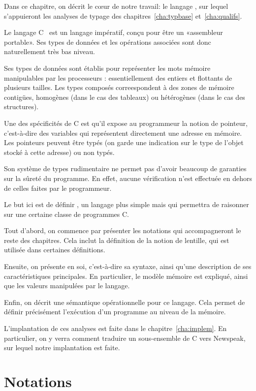 Dans ce chapitre, on décrit le cœur de notre travail: le langage \langname, sur
lequel s'appuieront les analyses de typage des chapitres~\ref{cha:typbase}
et~\ref{cha:qualifs}.

Le langage C~\cite{KandR} est un langage impératif, conçu pour être un
«assembleur portable». Ses types de données et les opérations associées sont
donc naturellement très bas niveau.

Ses types de données sont établis pour représenter les mots mémoire manipulables
par les processeurs : essentiellement des entiers et flottants de plusieurs
tailles. Les types composés correespondent à des zones de mémoire contigües,
homogènes (dans le cas des tableaux) ou hétérogènes (dans le cas des
structures).

Une des spécificités de C est qu'il expose au programmeur la notion de pointeur,
c'est-à-dire des variables qui représentent directement une adresse en mémoire.
Les pointeurs peuvent être typés (on garde une indication sur le type de l'objet
stocké à cette adresse) ou non typés.

Son système de types rudimentaire ne permet pas d'avoir beaucoup de garanties
sur la sûreté du programme. En effet, aucune vérification n'est effectuée en
dehors de celles faites par le programmeur.

Le but ici est de définir \langname, un langage plus simple mais qui permettra
de raisonner sur une certaine classe de programmes C.

Tout d'abord, on commence par présenter les notations qui accompagneront le
reste des chapitres. Cela inclut la définition de la notion de lentille, qui est
utilisée dans certaines définitions.

Ensuite, on présente \langname en soi, c'est-à-dire sa syntaxe, ainsi qu'une
description de ses caractéristiques principales. En particulier, le modèle
mémoire est expliqué, ainsi que les valeurs manipulées par le langage.

Enfin, on décrit une sémantique opérationnelle pour ce langage. Cela permet de
définir précisément l'exécution d'un programme \langname au niveau de la
mémoire.

L'implantation de ces analyses est faite dans le chapitre~\ref{cha:implem}. En
particulier, on y verra comment traduire un sous-ensemble de C vers Newspeak,
sur lequel notre implantation est faite.

\section{Notations}

